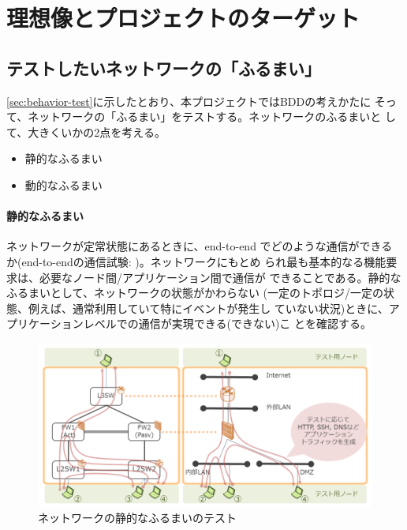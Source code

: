  \section{理想像とプロジェクトのターゲット}
 \label{sec:desired-and-target}


  \subsection{テストしたいネットワークの「ふるまい」}

\ref{sec:behavior-test}に示したとおり、本プロジェクトではBDDの考えかたに
そって、ネットワークの「ふるまい」をテストする。ネットワークのふるまいと
して、大きくいかの2点を考える。
\begin{itemize}
 \item 静的なふるまい
 \item 動的なふるまい
\end{itemize}

    \paragraph{静的なふるまい}
ネットワークが定常状態にあるときに、end-to-end でどのような通信ができる
か(end-to-endの通信試験: )。ネットワークにもとめ
られ最も基本的なる機能要求は、必要なノード間/アプリケーション間で通信が
できることである。静的なふるまいとして、ネットワークの状態がかわらない
(一定のトポロジ/一定の状態、例えば、通常利用していて特にイベントが発生し
ていない状況)ときに、アプリケーションレベルでの通信が実現できる(できない)こ
とを確認する。
\begin{figure}[h]
 \centering
 \includegraphics[scale=0.5]{img/test-static.png}
 \caption{ネットワークの静的なふるまいのテスト}
 \label{fig:test-static}
\end{figure}

